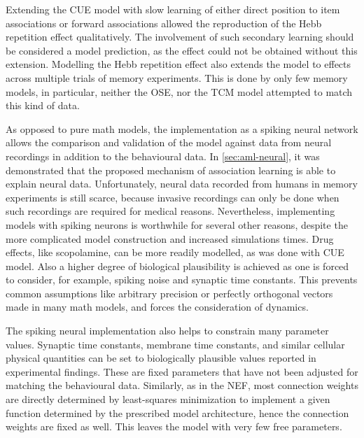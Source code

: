 Extending the CUE model with slow learning of either direct position to item associations or forward associations allowed the reproduction of the Hebb repetition effect qualitatively.
The involvement of such secondary learning should be considered a model prediction, as the effect could not be obtained without this extension.
Modelling the Hebb repetition effect also extends the model to effects across multiple trials of memory experiments.
This is done by only few memory models, in particular, neither the OSE, nor the TCM model attempted to match this kind of data.

As opposed to pure math models, the implementation as a spiking neural network allows the comparison and validation of the model against data from neural recordings in addition to the behavioural data.
In \cref{sec:aml-neural}, it was demonstrated that the proposed mechanism of association learning is able to explain neural data.
Unfortunately, neural data recorded from humans in memory experiments is still scarce, because invasive recordings can only be done when such recordings are required for medical reasons.
Nevertheless, implementing models with spiking neurons is worthwhile for several other reasons, despite the more complicated model construction and increased simulations times.
Drug effects, like scopolamine, can be more readily modelled, as was done with CUE model.
Also a higher degree of biological plausibility is achieved as one is forced to consider, for example, spiking noise and synaptic time constants.
This prevents common assumptions like arbitrary precision or perfectly orthogonal vectors made in many math models, and forces the consideration of dynamics.

The spiking neural implementation also helps to constrain many parameter values.
Synaptic time constants, membrane time constants, and similar cellular physical quantities can be set to biologically plausible values reported in experimental findings.
These are fixed parameters that have not been adjusted for matching the behavioural data.
Similarly, as in the NEF, most connection weights are directly determined by least-squares minimization to implement a given function determined by the prescribed model architecture, hence the connection weights are fixed as well.
This leaves the model with very few free parameters.

